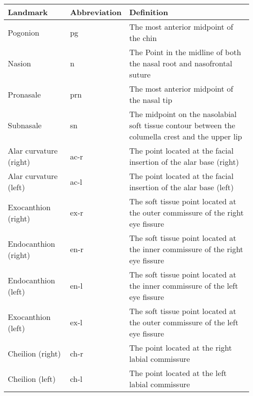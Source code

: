 \begin{table*}[!ht]

\label{table:landmark_names}
\begin{tabularx}{\textwidth}{l|l|L}
\toprule
Landmark               & Abbreviation & Definition          
\\
\midrule
Pogonion               & pg           & The most anterior midpoint of the chin                                                                              \\
Nasion                 & n            & The Point in the midline of both the nasal root and nasofrontal suture \\
Pronasale              & prn          & The most anterior midpoint of the nasal tip                                                                         \\
Subnasale              & sn           & The midpoint on the nasolabial soft tissue contour between the columella crest and the upper lip                    \\
Alar curvature (right) & ac-r         & The point located at the facial insertion of the alar base (right)                                                  \\
Alar curvature (left)  & ac-l         & The point located at the facial insertion of the alar base (left)                                                   \\
Exocanthion (right)    & ex-r         & The soft tissue point located at the outer commissure of the right eye fissure                                      \\
Endocanthion (right)   & en-r         & The soft tissue point located at the inner commissure of the right eye fissure                                       \\
Endocanthion (left)    & en-l         & The soft tissue point located at the inner commissure of the left eye fissure                                        \\
Exocanthion (left)     & ex-l         & The soft tissue point located at the outer commissure of the left eye fissure                                        \\
Cheilion (right)       & ch-r         & The point located at the right labial commissure                                                                    \\
Cheilion (left)        & ch-l         & The point located at the left labial commissure                                                                     
\end{tabularx}
\end{table*}

